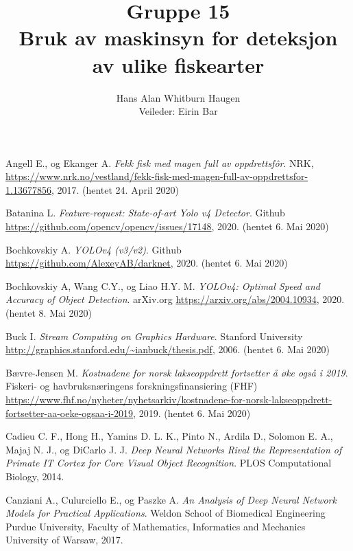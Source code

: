 \documentclass[11ot]{article}
\title{Gruppe 15\\Bruk av maskinsyn for deteksjon av ulike fiskearter}
\author{Hans Alan Whitburn Haugen\\Veileder: Eirin Bar}
\begin{document}

\newpage

\newpage

\newpage

\newpage

\tableofcontents
\clearpage
{}
\setcounter{page}{1}


%



%

\begin{thebibliography}{9}


Angell E., og Ekanger A. 
\textit{Fekk fisk med magen full av oppdrettsfôr}. 
NRK, \url{https://www.nrk.no/vestland/fekk-fisk-med-magen-full-av-oppdrettsfor-1.13677856}, 2017. (hentet 24. April 2020)

Batanina L.
\textit{Feature-request: State-of-art Yolo v4 Detector}. 
Github \url{https://github.com/opencv/opencv/issues/17148}, 2020. (hentet 6. Mai 2020)

Bochkovskiy A.
\textit{YOLOv4 (v3/v2)}. 
Github \url{https://github.com/AlexeyAB/darknet}, 2020. (hentet 6. Mai 2020)

Bochkovskiy A, Wang C.Y., og Liao H.Y. M.
\textit{YOLOv4: Optimal Speed and Accuracy of Object Detection}. 
arXiv.org \url{https://arxiv.org/abs/2004.10934}, 2020. (hentet 8. Mai 2020)

Buck I.
\textit{Stream Computing on Graphics Hardware}. 
Stanford University \url{http://graphics.stanford.edu/~ianbuck/thesis.pdf}, 2006. (hentet 6. Mai 2020)

Bævre-Jensen M.
\textit{Kostnadene for norsk lakseoppdrett fortsetter å øke også i 2019}. 
Fiskeri- og havbruksnæringens forskningsfinansiering (FHF) \url{https://www.fhf.no/nyheter/nyhetsarkiv/kostnadene-for-norsk-lakseoppdrett-fortsetter-aa-oeke-ogsaa-i-2019}, 2019. (hentet 6. Mai 2020)

Cadieu C. F., Hong H., Yamins D. L. K., Pinto N., Ardila D., Solomon E. A., Majaj N. J., og DiCarlo J. J. 
\textit{Deep Neural Networks Rival the Representation of Primate IT Cortex for Core Visual Object Recognition}. 
PLOS Computational Biology, 2014.

Canziani A., Culurciello E., og Paszke A. 
\textit{An Analysis of Deep Neural Network Models for Practical Applications}. 
Weldon School of Biomedical Engineering Purdue University, Faculty of Mathematics, Informatics and Mechanics University of Warsaw, 2017.


\end{thebibliography}
\end{document}
